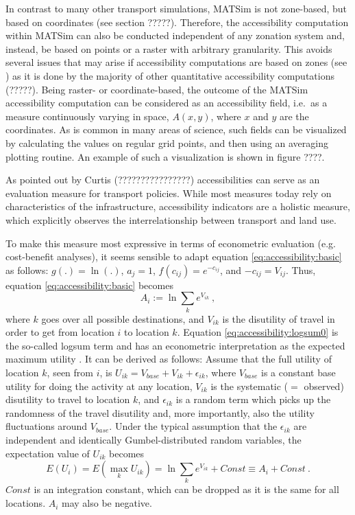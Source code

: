 In contrast to many other transport simulations, MATSim is not zone-based, but based on coordinates (see section ?????). Therefore, the accessibility computation within MATSim can also be conducted independent of any zonation system and, instead, be based on points or a raster with arbitrary granularity. This avoids several issues that may arise if accessibility computations are based on zones (see \citep[e.g.][]{NicolaiNagel2012HiResAccessibilityMethodInBook}) as it is done by the majority of other quantitative accessibility computations \citep[e.g.][]{Curtis, BBSR, LiuZhu2004AccessibilityAnalyst} (?????). Being raster- or coordinate-based, the outcome of the MATSim accessibility computation can be considered as an accessibility field,
i.e.\ as a measure continuously varying in space, $A(x,y)$, where $x$ and $y$
are the coordinates.  As is common in many areas of science, such
fields can be visualized by calculating the values on regular grid
points, and then using an averaging plotting routine. An example of such a visualization is shown in figure ????.

As pointed out by Curtis (????????????????) accessibilities can serve as an evaluation measure for transport policies. While most measures today rely on characteristics of the infrastructure, accessibility indicators are a holistic measure, which explicitly observes the interrelationship between transport and land use.

To make this measure most expressive in terms of econometric evaluation (e.g. cost-benefit analyses), it seems sensible to adapt equation \ref{eq:accessibility:basic} as follows: $g(.) = \ln(.)$, $a_j = 1$, $f(c_{ij}) = e^{-c_{ij}}$, and $-c_{ij} = V_{ij}$. Thus, equation \ref{eq:accessibility:basic} becomes
\begin{equation}
A_i := \ln \sum_k e^{V_{ik}} \ ,
\label{eq:accessibility:logsum0}
\end{equation}
where $k$ goes over all possible destinations, and $V_{ik}$ is the
disutility of travel in order to get from location $i$ to location
$k$. Equation \ref{eq:accessibility:logsum0} is the so-called logsum term and has an econometric interpretation as the expected maximum utility \citep[e.g.][]{Ben-AkivaBook}. It can be derived as follows: Assume that the full utility of location $k$, seen from $i$, is $U_{ik} = V_{base} + V_{ik} + \epsilon_{ik}$, where $V_{base}$ is a constant base utility for doing the activity at any location, $V_{ik}$ is the systematic ($=$ observed) disutility to travel to location $k$, and $\epsilon_{ik}$ is a random term which picks up the randomness of the travel disutility and, more importantly, also the utility fluctuations around $V_{base}$.  Under the typical assumption that the $\epsilon_{ik}$ are independent and identically Gumbel-distributed random variables, the expectation value of $U_{ik}$ becomes
\begin{equation}
E(U_i) = E(\max_k U_{ik}) = \ln \sum_k e^{V_{ik}} + Const \equiv A_i + Const \ .
\end{equation}
$Const$ is an integration constant, which can be dropped as it is the same for all locations. $A_i$ may also be negative.




